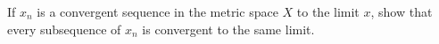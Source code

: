 If $x_n$ is a convergent sequence in the metric space $X$ to the limit $x$, show that every subsequence
of $x_n$ is convergent to the same limit.\\
